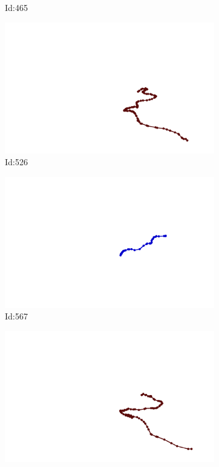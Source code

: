 \documentclass[12pt,twoside]{report}
\begin{document}
\begin{figure}
\begin{subfigure}[b]{0.20\textwidth}
\caption{Id:465}
\end{subfigure}
\begin{subfigure}[b]{0.20\textwidth}
\centering
\includegraphics[width=\textwidth]{../../trajectories/526.png}
\caption{Id:526}
\end{subfigure}
\begin{subfigure}[b]{0.20\textwidth}
\centering
\includegraphics[width=\textwidth]{../../trajectories/567.png}
\caption{Id:567}
\end{subfigure}
\begin{subfigure}[b]{0.20\textwidth}
\centering
\includegraphics[width=\textwidth]{../../trajectories/596.png}

\end{subfigure}
\end{figure}
\end{document}
